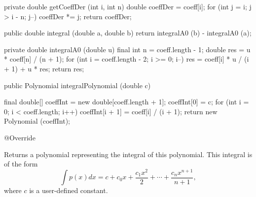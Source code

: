 \begin{code}\begin{hide}

   private double getCoeffDer (int i, int n) {
      double coeffDer = coeff[i];
      for (int j = i; j > i - n; j--)
         coeffDer *= j;
      return coeffDer;
   }

   public double integral (double a, double b) {
      return integralA0 (b) - integralA0 (a);
   }

   private double integralA0 (double u) {
      final int n = coeff.length - 1;
      double res = u * coeff[n] / (n + 1);
      for (int i = coeff.length - 2; i >= 0; i--)
         res = coeff[i] * u / (i + 1) + u * res;
      return res;
   }\end{hide}

   public Polynomial integralPolynomial (double c)\begin{hide} {
      final double[] coeffInt = new double[coeff.length + 1];
      coeffInt[0] = c;
      for (int i = 0; i < coeff.length; i++)
         coeffInt[i + 1] = coeff[i] / (i + 1);
      return new Polynomial (coeffInt);
   }

   @Override
\end{hide}
\end{code}
\begin{tabb} Returns a polynomial representing the integral of this polynomial.
 This integral is of the form
\[\int p(x)dx = c + c_0x + \frac{c_1 x^2}2 + \cdots + \frac{c_n x^{n+1}}{n+1},
 \]
where $c$ is a user-defined constant.
\end{tabb}
\begin{htmlonly}
\end{htmlonly}
\begin{code}\begin{hide}

   public String toString () {
      final StringBuilder sb = new StringBuilder ();
      for (int i = 0; i < coeff.length; i++) {
         if (i > 0) {
            if (coeff[i] == 0)
               continue;
            else if (coeff[i] > 0)
               sb.append (" + ");
            else
               sb.append (" - ");
            sb.append (PrintfFormat.format (8, 3, 3, Math.abs (coeff[i])));
         }
         else
            sb.append (PrintfFormat.format (8, 3, 3, coeff[i]));
         if (i > 0) {
            sb.append ("*X");
            if (i > 1)
               sb.append ("^").append (i);
         }
      }
      return sb.toString ();
   }

   @Override
   public Polynomial clone () {
      Polynomial pol;
      try {
         pol = (Polynomial) super.clone ();
      }
      catch (final CloneNotSupportedException cne) {
         throw new IllegalStateException ("Clone not supported");
      }
      pol.coeff = coeff.clone ();
      return pol;
   }
}\end{hide}
\end{code}
